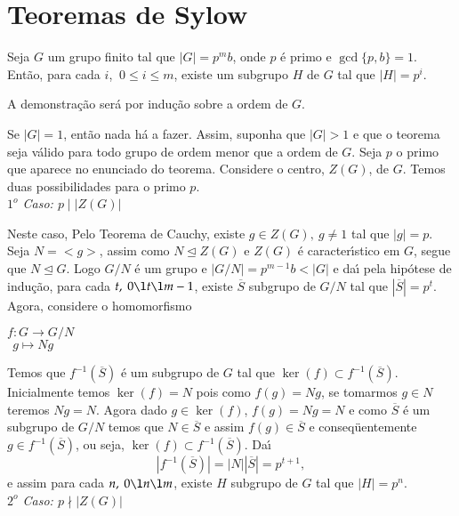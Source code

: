 

\section{Teoremas de Sylow} %
\label{sec:teoremas_de_sylow}

\begin{teorema}\label{primeiro_teorema_de_sylow}
Seja $G$ um grupo finito tal que \linebreak $|G| = p^m b$, onde
$p$ {\'e} primo e $\gcd\{p, b\} = 1$. Ent{\~a}o, para cada
$i$, $\ 0 \le i \le m$, existe um subgrupo $H$ de $G$ tal que $|H| =
p^i$.
\end{teorema}
\begin{prova}
A demonstra{\c c}{\~a}o ser{\'a} por indu{\c c}{\~a}o sobre a ordem de $G$.

Se $|G| = 1$, ent{\~a}o nada h{\'a} a fazer. Assim, suponha que $|G| > 1$ e
que o teorema seja v{\'a}lido para todo grupo de ordem menor que a ordem de
$G$. Seja $p$ o primo que aparece no enunciado do teorema. Considere o
centro, $Z(G)$, de $G$. Temos duas possibilidades para o primo $p$.\\
\textit{$1^o$ Caso: $p \mid |Z(G)|$}

Neste caso, Pelo Teorema de Cauchy, existe $g \in Z(G),\ g \neq 1$ tal que
$|g| = p$. Seja $N = <g>$, assim como $N \trianglelefteq Z(G)$ e $Z(G)$
{\'e} caracter{\'\i}stico em $G$, segue que $N \trianglelefteq G$. Logo
$G/N$ {\'e} um grupo e $|G/N| = p^{m-1}b < |G|$ e da{\'\i} pela hip{\'o}tese
de indu{\c c}{\~a}o, para cada $t,\ 0 \l t \l m-1$, existe $\overline{S}$
subgrupo de $G/N$ tal que $|\overline{S}| = p^t$. Agora, considere o
homomorfismo 
\begin{center}
$ f: G \to G/N$\\
$\ \ g \mapsto Ng$
\end{center}

Temos que $f^{-1}(\overline{S})$ {\'e} um subgrupo de $G$ tal que $\ker(f)
\subset f^{-1}(\overline{S})$. Inicialmente temos $\ker (f) = N$ pois como
$f(g) = Ng$, se tomarmos $g \in N$  teremos $Ng = N$. Agora dado $g \in \ker
(f)$, $f(g) = Ng = N$ e como $\overline{S}$ {\'e} um subgrupo de $G/N$ temos
que $N \in \overline{S}$ e assim $f(g) \in \overline{S}$ e
conseq{\"u}entemente $g \in f^{-1} (\overline{S})$, ou seja, $\ker (f) \subset
f^{-1}(\overline{S})$. Da{\'\i} $$|f^{-1}(\overline{S})| = |N||\overline{S}|
= p^{t+1},$$ e assim para cada $n,\ 0 \l n \l m$, existe $H$ subgrupo de $G$
tal que $|H| = p^n$.
\vspace{.3cm}\\
\textit{$2^o$ Caso: $p \nmid |Z(G)|$}


\end{prova}
